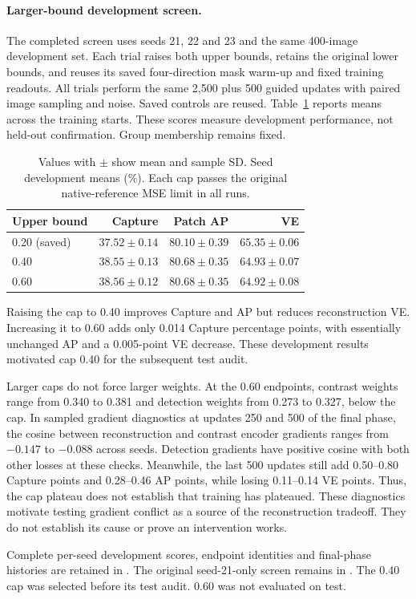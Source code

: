\paragraph{Larger-bound development screen.}\label{app:higherbound}
The completed screen uses seeds 21, 22 and 23 and the same 400-image
development set. Each trial raises both upper bounds, retains the original
lower bounds, and reuses its saved four-direction mask warm-up and fixed
training readouts. All trials perform the same 2,500 plus 500 guided
updates with paired image sampling and noise. Saved controls are reused.
Table~\ref{tab:higherbound} reports means across the training starts. These
scores measure development performance, not held-out confirmation.
Group membership remains fixed.

\begin{table}[t]\centering\small
\caption{Values with $\pm$ show mean and sample SD. Seed development means (\%). Each cap passes the original
native-reference MSE limit in all runs.}\label{tab:higherbound}
\begin{tabular}{@{}lrrr@{}}\hline
Upper bound & Capture & Patch AP & VE\\\hline
0.20 (saved) & $37.52\pm0.14$ & $80.10\pm0.39$ & $65.35\pm0.06$\\
0.40 & $38.55\pm0.13$ & $80.68\pm0.35$ & $64.93\pm0.07$\\
0.60 & $38.56\pm0.12$ & $80.68\pm0.35$ & $64.92\pm0.08$\\\hline
\end{tabular}\end{table}

Raising the cap to 0.40 improves Capture and AP but reduces reconstruction
VE. Increasing it to 0.60 adds only 0.014 Capture percentage points, with
essentially unchanged AP and a 0.005-point VE decrease. These development
results motivated cap 0.40 for the subsequent test audit.

Larger caps do not force larger weights. At the 0.60 endpoints, contrast
weights range from 0.340 to 0.381 and detection weights from 0.273 to
0.327, below the cap. In sampled gradient diagnostics at updates 250 and
500 of the final phase, the cosine between reconstruction and contrast
encoder gradients ranges from $-0.147$ to $-0.088$ across seeds. Detection
gradients have positive cosine with both other losses at these checks.
Meanwhile, the last 500 updates still add 0.50--0.80 Capture points and
0.28--0.46 AP points, while losing 0.11--0.14 VE points. Thus, the cap
plateau does not establish that training has plateaued. These diagnostics
motivate testing gradient conflict as a source of the reconstruction
tradeoff. They do not establish its cause or prove an intervention works.

Complete per-seed development scores, endpoint identities and final-phase
histories are retained in . The original
seed-21-only screen remains in . The 0.40 cap
was selected before its test audit. 0.60 was not evaluated on test.


